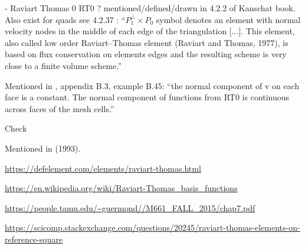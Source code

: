 
- Raviart Thomas 0 RT0 \cite{rath77} ? mentioned/defined/drawn in 4.2.2 of 
Kanschat book. Also exist for quads see 4.2.37 
\textcite{hald03}: ``$P_1^\perp \times P_0$ symbol denotes an element with 
normal velocity nodes in the middle of each edge of the
triangulation [...]. This element, also called low order Raviart–Thomas element 
(Raviart and Thomas, 1977), is based on flux conservation on elements edges and 
the resulting scheme is very close to a finite volume scheme.''

Mentioned in \textcite{john16}, appendix B.3, example B.45: ``the normal component of v 
on each face is a constant. The normal component of functions from RT0 is
continuous across faces of the mesh cells.''

Check \textcite{brfo}

Mentioned in \textcite{chen93a} (1993).

\url{https://defelement.com/elements/raviart-thomas.html}


\url{
https://en.wikipedia.org/wiki/Raviart-Thomas_basis_functions
}

\url{
https://people.tamu.edu/~guermond//M661_FALL_2015/chap7.pdf
}

\url{
https://scicomp.stackexchange.com/questions/20245/raviart-thomas-elements-on-reference-square
}



